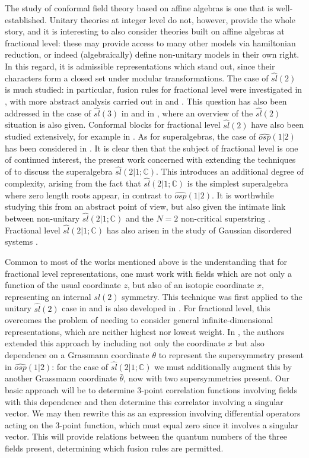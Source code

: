 \documentclass[a4paper,12pt]{article}
\def\thetabar    {\bar{\theta}}
\def\hslc        {\hat{sl}(2|1;{\mathbb C})}
\begin{document}
The study of conformal field theory based on affine algebras is one
that is well-established.  Unitary theories at integer level do not,
however, provide the whole story, and it is interesting to also
consider theories built on affine algebras at fractional level: these
may provide access to many other models via hamiltonian reduction, or
indeed (algebraically) define non-unitary models in 
their own right.  In this regard, it is admissible representations
which stand out, since their characters form a closed set under
modular transformations.  The case of $\hat{sl}(2)$ is much studied:
in particular, fusion rules for fractional level were investigated in
\cite{MW, AY, BF, FGP}, with more abstract analysis carried out in
\cite{FM} and \cite{DLM}. This question has also been
addressed in the case of $\hat{sl}(3)$ in \cite{FGP1, FGP2} and 
in \cite{GPW}, where an overview of the $\hat{sl}(2)$ situation is also given.  
Conformal blocks for fractional level $\hat{sl}(2)$ have also been studied
extensively, for example in \cite{FGP, PRY, And}.  As for
superalgebras, the case of $\widehat{osp}(1|2)$ has been considered in
\cite{ER}.  It is clear then that the subject of fractional level is
one of continued interest, the present work concerned with extending
the techniques of \cite{ER} to discuss the superalgebra $\hslc$.  This
introduces an additional degree of complexity, arising from the
fact that $\hslc$ is the simplest superalgebra where zero length
roots appear, in contrast to $\widehat{osp}(1|2)$.  It is worthwhile
studying this from an abstract point of view, but also given the
intimate link between non-unitary $\hslc$ and the $N=2$ non-critical
superstring \cite{Sem}.  Fractional level $\hslc$ has also arisen in
the study of Gaussian disordered systems \cite{MS}. 

Common to most of the works mentioned above is the understanding that
for fractional level representations, one must work with fields which
are not only a function of the usual coordinate $z$, but also of an
isotopic coordinate $x$, representing an internal $sl(2)$ symmetry.
This technique was first applied to the unitary $\hat{sl}(2)$ case in
\cite{FZ} and is also developed in \cite{BS}.  For fractional level,
this overcomes the problem of needing to consider general
infinite-dimensional representations, which are neither highest nor
lowest weight.  In \cite{ER}, the authors extended this approach by
including not only the coordinate $x$ but also dependence on a
Grassmann coordinate $\theta$ to represent the supersymmetry present
in $\widehat{osp}(1|2)$: for the case of $\hslc$ we must additionally
augment this by another Grassmann coordinate $\thetabar$, now with two
supersymmetries present.  Our basic approach will be to determine
3-point correlation functions involving fields with this
dependence and then determine this correlator involving a singular
vector.  We may then rewrite this as an expression involving
differential operators acting on the 3-point function, which must
equal zero since it involves a singular vector.  This will provide
relations between the quantum numbers of the three fields present,
determining which fusion rules are permitted.  
\end{document}
